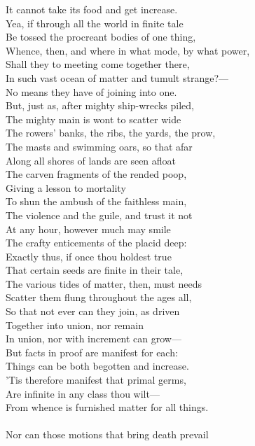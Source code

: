 It cannot take its food and get increase.\\
Yea, if through all the world in finite tale\\
Be tossed the procreant bodies of one thing,\\
Whence, then, and where in what mode, by what power,\\
Shall they to meeting come together there,\\
In such vast ocean of matter and tumult strange?—\\
No means they have of joining into one.\\
But, just as, after mighty ship-wrecks piled,\\
The mighty main is wont to scatter wide\\
The rowers' banks, the ribs, the yards, the prow,\\
The masts and swimming oars, so that afar\\
Along all shores of lands are seen afloat\\
The carven fragments of the rended poop,\\
Giving a lesson to mortality\\
To shun the ambush of the faithless main,\\
The violence and the guile, and trust it not\\
At any hour, however much may smile\\
The crafty enticements of the placid deep:\\
Exactly thus, if once thou holdest true\\
That certain seeds are finite in their tale,\\
The various tides of matter, then, must needs\\
Scatter them flung throughout the ages all,\\
So that not ever can they join, as driven\\
Together into union, nor remain\\
In union, nor with increment can grow—\\
But facts in proof are manifest for each:\\
Things can be both begotten and increase.\\
'Tis therefore manifest that primal germs,\\
Are infinite in any class thou wilt—\\
From whence is furnished matter for all things.\\
\\
Nor can those motions that bring death prevail\\
